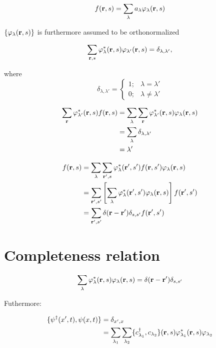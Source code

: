 \begin{equation}
	f(\vb{r},s) = \sum_\lambda a_\lambda \varphi_\lambda (\vb{r}, s)
\end{equation}

$\{ \varphi_\lambda(\vb{r},s) \}$ is furthermore assumed to be orthonormalized

\begin{equation}
	\sum_{\vb{r},s} \varphi_\lambda^* (\vb{r},s) \varphi_{\lambda'} (\vb{r},s) = \delta_{\lambda, \lambda'},
\end{equation}

where 
\[
	\delta_{\lambda, \lambda'}=
\begin{cases}
	1;& \lambda = \lambda'\\
	0; & \lambda \neq \lambda' 
\end{cases}
\]

\begin{align*}
	\sum_{\vb{r}} \varphi_{\lambda'}^*(\vb{r},s) f(\vb{r},s) &= \sum_\lambda \sum_{\vb{r}} \varphi_{\lambda'}^*(\vb{r},s) \varphi_\lambda(\vb{r},s)\\
	&= \sum_\lambda \delta_{\lambda, \lambda'}\\
	&= \lambda'
\end{align*}

\begin{align*}
	f(\vb{r},s) &= \sum_\lambda \sum_{\vb{r'},s} \varphi_\lambda^* (\vb{r'},s') f(\vb{r},s') \varphi_\lambda (\vb{r},s)\\
	&= \sum_{\vb{r'},s'} \left[ \sum_\lambda \varphi_\lambda^* (\vb{r'},s') \varphi_\lambda (\vb{r},s) \right] f(\vb{r'},s') \\
	&= \sum_{\vb{r'},s'} \delta(\vb{r}-\vb{r'}) \delta_{s,s'} f(\vb{r'},s')
\end{align*}
 
\section{Completeness relation}

\begin{equation}
	\sum_\lambda \varphi_\lambda^* (\vb{r},s) \varphi_\lambda(\vb{r},s) = \delta(\vb{r}-\vb{r'}) \delta_{s,s'}
\end{equation}

Futhermore:

\begin{align}
	\{ \psi^\dagger(x',t), \psi(x,t) \} &= \delta_{x',x} \label{complete_1} \\
	&= \sum_{\lambda_1} \sum_{\lambda_2} \{c^{\dagger}_{\lambda_1}, c_{\lambda_2} \} (\vb{r},s)  \varphi_{\lambda_1}^* (\vb{r},s) \varphi_{\lambda_2} \nonumber
\end{align}

